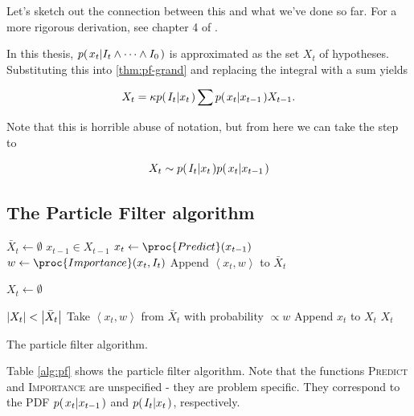 Let's sketch out the connection between this and what we've done so
far. For a more rigorous derivation, see chapter 4 of \cite{ProbRob}.

In this thesis, $p{(\left. x_t \middle\vert I_t \wedge \dots \wedge I_0 \right.)}$ is
approximated as the set $X_t$ of hypotheses. Substituting this into
\eqref{thm:pf-grand} and replacing the integral with a sum yields

\begin{equation}
  X_t = \kappa p{(\left. I_t \middle\vert x_t \right.)} \sum { p{(\left. x_t \middle\vert x_{t-1} \right.)} X_{t-1} }.
\end{equation}

Note that this is horrible abuse of notation, but from here we can
take the step to

\begin{equation}
  X_t \sim p{(\left. I_t \middle\vert x_t \right.)} p{(\left. x_t \middle\vert x_{t-1} \right.)}
\end{equation}

\subsection{The Particle Filter algorithm}
\begin{table}
  \begin{codebox}
    \li $\bar{X}_t \gets \emptyset$
    \li \ForEach $x_{t-1} \in X_{t-1}$
    \li \Do
    \li $x_t \gets \proc{Predict}(x_{t-1})$
    \li $w \gets \proc{Importance}(x_t,I_t)$
    \li Append $\left<x_t, w\right>$ to $\bar{X}_t$
    \End
    \li
    
    \li $X_t \gets \emptyset$
    
    \li \While $\left\vert X_t \right\vert < \left\vert \bar{X}_t \right\vert$
    \li \Do
    \li Take $\left<x_t, w\right>$ from $\bar{X}_t$ with probability $\propto w$
    \li Append $x_t$ to $X_t$
    \End
    \li \Return $X_t$
  \end{codebox}
  \caption{The particle filter algorithm.}
  \label{alg:pf}
\end{table}

Table \ref{alg:pf} shows the particle filter algorithm. Note that the
functions \textsc{Predict} and \textsc{Importance} are unspecified -
they are problem specific. They correspond to the PDF $p{(\left. x_t \middle\vert x_{t-1} \right.)}$
and $p{(\left. I_t \middle\vert x_t \right.)}$, respectively.


